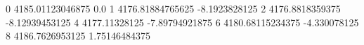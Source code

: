 0 4185.01123046875 0.0
1 4176.81884765625 -8.1923828125
2 4176.8818359375 -8.12939453125
4 4177.11328125 -7.89794921875
6 4180.68115234375 -4.330078125
8 4186.7626953125 1.75146484375
